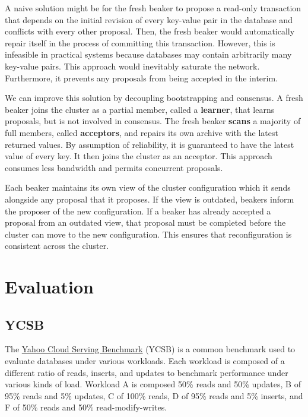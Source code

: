 \documentclass[../main.tex]{subfiles}
\begin{document}
  A naive solution might be for the fresh beaker to propose a read-only transaction that depends on
  the initial revision of every key-value pair in the database and conflicts with every other
  proposal. Then, the fresh beaker would automatically repair itself in the process of committing
  this transaction. However, this is infeasible in practical systems because databases may contain
  arbitrarily many key-value pairs. This approach would inevitably saturate the network.
  Furthermore, it prevents any proposals from being accepted in the interim.

  We can improve this solution by decoupling bootstrapping and consensus. A fresh beaker joins the
  cluster as a partial member, called a \textbf{learner}, that learns proposals, but is not involved
  in consensus. The fresh beaker \textbf{scans} a majority of full members, called
  \textbf{acceptors}, and repairs its own archive with the latest returned values. By assumption of
  reliability, it is guaranteed to have the latest value of every key. It then joins the cluster as
  an acceptor. This approach consumes less bandwidth and permits concurrent proposals.

  Each beaker maintains its own view of the cluster configuration which it sends alongside any
  proposal that it proposes. If the view is outdated, beakers inform the proposer of the new
  configuration. If a beaker has already accepted a proposal from an outdated view, that proposal
  must be completed before the cluster can move to the new configuration. This ensures that
  reconfiguration is consistent across the cluster.

\section{Evaluation}

  \subsection{YCSB}
  The \href{https://github.com/brianfrankcooper/YCSB}{Yahoo Cloud Serving Benchmark} (YCSB) is a
  common benchmark used to evaluate databases under various workloads. Each workload is composed of
  a different ratio of reads, inserts, and updates to benchmark performance under various kinds of
  load. Workload A is composed 50\% reads and 50\% updates, B of 95\% reads and 5\% updates, C of
  100\% reads, D of 95\% reads and 5\% inserts, and F of 50\% reads and 50\% read-modify-writes.
\end{document}
